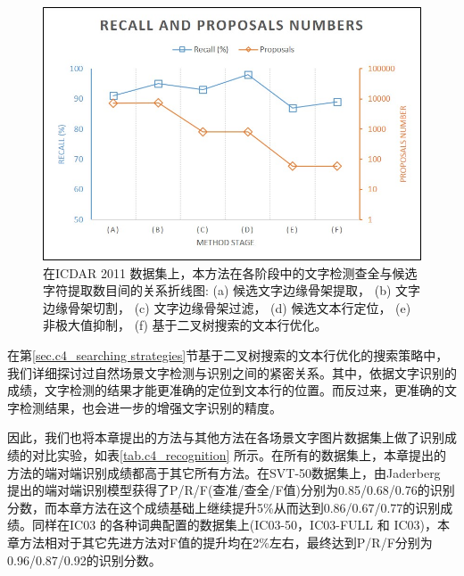         \begin{figure}[!h]
        \centering
        \includegraphics[width=\textwidth]{./figures/c4_recall_proposals.jpg}
        \caption{在ICDAR 2011 数据集上，本方法在各阶段中的文字检测查全与候选字符提取数目间的关系折线图: (a) 候选文字边缘骨架提取， (b) 文字边缘骨架切割， (c) 文字边缘骨架过滤， (d) 候选文本行定位， (e)非极大值抑制， (f) 基于二叉树搜索的文本行优化。}
        \label{fig.c4_recall_proposals}
        \end{figure}

        在第\ref{sec.c4_searching strategies}节基于二叉树搜索的文本行优化的搜索策略中，我们详细探讨过自然场景文字检测与识别之间的紧密关系。其中，依据文字识别的成绩，文字检测的结果才能更准确的定位到文本行的位置。而反过来，更准确的文字检测结果，也会进一步的增强文字识别的精度。

        因此，我们也将本章提出的方法与其他方法在各场景文字图片数据集上做了识别成绩的对比实验，如表\ref{tab.c4_recognition} 所示。在所有的数据集上，本章提出的方法的端对端识别成绩都高于其它所有方法。在SVT-50数据集上，由Jaderberg\cite{Jaderberg2016Reading} 提出的端对端识别模型获得了P/R/F(查准/查全/F值)分别为0.85/0.68/0.76的识别分数，而本章方法在这个成绩基础上继续提升5\%从而达到0.86/0.67/0.77的识别成绩。同样在IC03 的各种词典配置的数据集上(IC03-50，IC03-FULL 和 IC03)，本章方法相对于其它先进方法对F值的提升均在2\%左右，最终达到P/R/F分别为0.96/0.87/0.92的识别分数。

